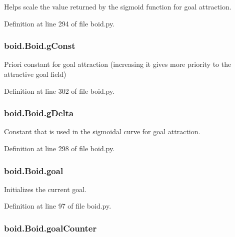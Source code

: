 Helps scale the value returned by the sigmoid function for goal attraction. 



Definition at line 294 of file boid.\-py.

\hypertarget{classboid_1_1Boid_a71d768a5bc70ecfcaec719cfd0c310ef}{
\subsubsection[{g\-Const}]{\setlength{\rightskip}{0pt plus 5cm}boid.\-Boid.\-g\-Const}}\label{classboid_1_1Boid_a71d768a5bc70ecfcaec719cfd0c310ef}


Priori constant for goal attraction (increasing it gives more priority to the attractive goal field) 



Definition at line 302 of file boid.\-py.

\hypertarget{classboid_1_1Boid_a17cd80cfac0fb27106c12e45929f9a9f}{
\subsubsection[{g\-Delta}]{\setlength{\rightskip}{0pt plus 5cm}boid.\-Boid.\-g\-Delta}}\label{classboid_1_1Boid_a17cd80cfac0fb27106c12e45929f9a9f}


Constant that is used in the sigmoidal curve for goal attraction. 



Definition at line 298 of file boid.\-py.

\hypertarget{classboid_1_1Boid_afe8350d9d4c1eeb15a5df7337328e1c7}{
\subsubsection[{goal}]{\setlength{\rightskip}{0pt plus 5cm}boid.\-Boid.\-goal}}\label{classboid_1_1Boid_afe8350d9d4c1eeb15a5df7337328e1c7}


Initializes the current goal. 



Definition at line 97 of file boid.\-py.

\hypertarget{classboid_1_1Boid_a8a871af6fc4d19477ce4881eb9ddc629}{
\subsubsection[{goal\-Counter}]{\setlength{\rightskip}{0pt plus 5cm}boid.\-Boid.\-goal\-Counter}}\label{classboid_1_1Boid_a8a871af6fc4d19477ce4881eb9ddc629}


